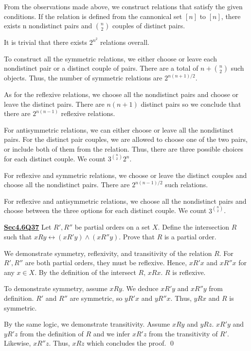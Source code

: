 \documentclass{article}
\newcommand{\new}[1]{
    \vspace{2mm}
    \noindent
    \textbf{
    \underline{#1}}
}
\begin{document}
From the observations made above, we construct relations that satisfy 
the given conditions. If the relation is defined from the cannonical 
set $[n]$ to $[n]$, there exists n nondistinct pairs and $\binom{n}{2}$
couples of distinct pairs. 

It is trivial that there exists $\boxed{2^{n^2}}$ relations overall. 

To construct all the symmetric relations, we either choose or leave 
each nondistinct pair or a distinct couple of pairs. There 
are a total of $n + \binom{n}{2}$ such objects. Thus, the 
number of symmetric relations are $\boxed{2^{n(n+1)/2}}$. 

As for the reflexive relations, we choose all the nondistinct 
pairs and choose or leave the distinct pairs. There are $n(n+1)$ 
distinct pairs so we conclude that there are $\boxed{2^{n(n-1)}}$ 
reflexive relations. 

For antisymmetric relations, we can either choose or leave 
all the nondistinct pairs. For the distinct pair couples, we 
are allowed to choose one of the two pairs, or include both of 
them from the relation. Thus, there are three possible choices 
for each distinct couple. We count $\boxed{3^{\binom{n}{2}}2^n}$. 

For reflexive and symmetric relations, we choose or 
leave the distinct couples and choose all the nondistinct pairs. There 
are $\boxed{2^{n(n-1)/2}}$ such relations. 

For reflexive and antisymmetric relations, we choose all 
the nondistinct pairs and choose between the three options 
for each distinct couple. We count $\boxed{3^{\binom{n}{2}}}$.




\new{Sec4.6Q37} Let $R', R''$ be partial orders on a set $X$. 
Define the intersection $R$ such that $xRy \leftrightarrow (xR'y) \wedge 
(xR''y)$. Prove that $R$ is a partial order. 

\proof
We demonstrate symmetry, reflexivity, and transitivity of the relation 
$R$. For $R', R''$ are both partial orders, they must be reflexive. 
Hence, $xR'x$ and $xR''x$ for any $x \in X$. By the definition of 
the intersect $R$, $xRx$. $R$ is reflexive.

To demonstrate symmetry, assume $xRy$. We deduce $xR'y$ and $xR''y$ 
from definition. $R'$ and $R''$ are symmetric, so $yR'x$ and $yR''x$. 
Thus, $yRx$ and $R$ is symmetric. 

By the same logic, we demonstrate transitivity. Assume $xRy$ and $yRz$. 
$xR'y$ and $yR'z$ from the definition of $R$ and we infer $xR'z$ from 
the transitivity of $R'$. Likewise, $xR''z$. Thus, $xRz$ which concludes 
the proof. \hfill \qed
\end{document}
